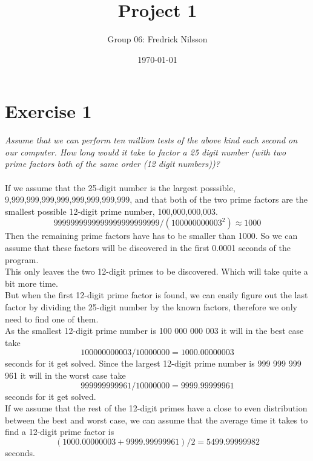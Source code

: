 \documentclass[12pt]{article}
\title{Project 1}
\author{Group 06: Fredrick Nilsson}
\date{\today}
\begin{document}
\maketitle


\newpage

\section*{Exercise 1}
\textit{Assume that we can perform ten million tests of the above kind each second on our computer. How long would it take to factor a 25 digit number (with two prime factors both of the same order (12 digit numbers))?}
\\
\\
If we assume that the 25-digit number is the largest posssible, 9,999,999,999,999,999,999,999,999, and that both of the two prime factors are the smallest possible 12-digit prime number, 100,000,000,003. \[ 9999999999999999999999999/(100000000003^2) \approx 1000 \]
Then the remaining prime factors have has to be smaller than 1000. So we can assume that these factors will be discovered in the first 0.0001 seconds of the program.
\\
This only leaves the two 12-digit primes to be discovered. Which will take quite a bit more time.
\\
But when the first 12-digit prime factor is found, we can easily figure out the last factor by dividing the 25-digit number by the known factors, therefore we only need to find one of them.
\\
As the smallest 12-digit prime number is 100 000 000 003 it will in the best case take \[100000000003/10000000 = 1000.00000003 \] seconds for it get solved. Since the largest 12-digit prime number is 999 999 999 961 it will in the worst case take \[999999999961/10000000 = 9999.99999961 \] seconds for it get solved.
\\ 
If we assume that the rest of the 12-digit primes have a close to even distribution between the best and worst case, we can assume that the average time it takes to find a 12-digit prime factor is \[ (1000.00000003 + 9999.99999961)/2 = 5499.99999982 \] seconds.

\newpage
\end{document}
